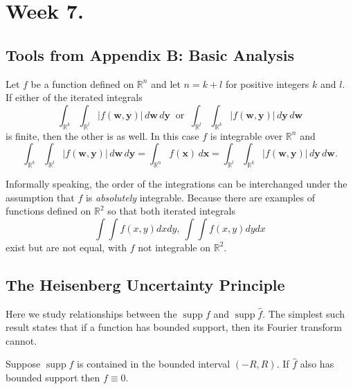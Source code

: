 \section{Week 7.}

\subsection{Tools from Appendix B: Basic Analysis}

\begin{theorem}
    Let $f$ be a function defined on $\mathbb R^n$ and let $n=k+l$ for positive integers $k$ and $l$. If either of the iterated integrals 
    \[\int_{\mathbb R^k}\int_{\mathbb R^l}\vert f(\mathbf w,\mathbf y)\vert \,d\mathbf w\,d\mathbf y~\text{ or }~\int_{\mathbb R^l}\int_{\mathbb R^k}\vert f(\mathbf w,\mathbf y)\vert \,d\mathbf y\,d\mathbf w\]is finite, then the other is as well. In this case $f$ is integrable over $\mathbb R^n$ and 
    \[\int_{\mathbb R^k}\int_{\mathbb R^l}\vert f(\mathbf w,\mathbf y)\vert \,d\mathbf w\,d\mathbf y=\int_{\mathbb R^n}f(\mathbf x)\,d\mathbf x=\int_{\mathbb R^l}\int_{\mathbb R^k}\vert f(\mathbf w,\mathbf y)\vert \,d\mathbf y\,d\mathbf w.\]
\end{theorem}

\begin{remark}
    Informally speaking, the order of the integrations can be interchanged under the assumption that $f$ is \textit{absolutely} integrable. Because there are examples of functions defined on $\mathbb R^2$ so that both iterated integrals
    \[\int\int f(x,y)dxdy,~\int\int f(x,y)dydx\] exist but are not equal, with $f$ not integrable on $\mathbb R^2$.
\end{remark}

\subsection{The Heisenberg Uncertainty Principle}

Here we study relationships between the $\operatorname{supp} f$ and $\operatorname{supp}\hat{f}$. The simplest such result states that if a function has bounded support, then its Fourier transform cannot.

\begin{proposition}[Proposition 4.4.1.]
    Suppose $\operatorname{supp}f$ is contained in the bounded interval $(-R,R)$. If $\hat{f}$ also has bounded support then $f\equiv 0$.
\end{proposition}

